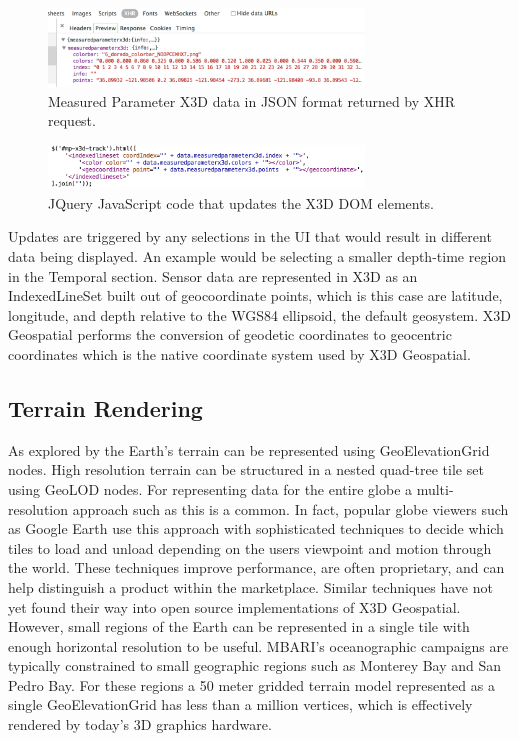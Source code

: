 \documentclass[conference]{IEEEtran}
\begin{document}
\begin{figure}[!htbp]
\centering
\includegraphics[width=3.3in]{JSONData.png}
\caption{Measured Parameter X3D data in JSON format returned by XHR request.}
\label{fig:JSONData}
\end{figure}

\begin{figure}[!htbp]
\centering
\includegraphics[width=3.3in]{jQueryDOMUpdateGeo.png}
\caption{JQuery JavaScript code that updates the X3D DOM elements.}
\label{fig:jQueryDOMUpdateGeo}
\end{figure}

Updates are triggered by any selections in the UI that would result in different data being displayed. An example would be selecting a smaller depth-time region in the Temporal section. Sensor data are represented in X3D as an IndexedLineSet built out of geocoordinate points, which is this case are latitude, longitude, and depth relative to the WGS84 ellipsoid, the default geosystem. X3D Geospatial performs the conversion of geodetic coordinates to geocentric coordinates which is the native coordinate system used by X3D Geospatial.

\subsection{Terrain Rendering}

As explored by \cite{yoo09} the Earth's terrain can be represented using GeoElevationGrid nodes. High resolution terrain can be structured in a nested quad-tree tile set using GeoLOD nodes. For representing data for the entire globe a multi-resolution approach such as this is a common. In fact, popular globe viewers such as Google Earth use this approach with sophisticated techniques to decide which tiles to load and unload depending on the users viewpoint and motion through the world. These techniques improve performance, are often proprietary, and can help distinguish a product within the marketplace. Similar techniques have not yet found their way into open source implementations of X3D Geospatial. However, small regions of the Earth can be represented in a single tile with enough horizontal resolution to be useful. MBARI's oceanographic campaigns are typically constrained to small geographic regions such as Monterey Bay and San Pedro Bay. For these regions a 50 meter gridded terrain model represented as a single GeoElevationGrid has less than a million vertices, which is effectively  rendered by today's 3D graphics hardware.
\end{document}
